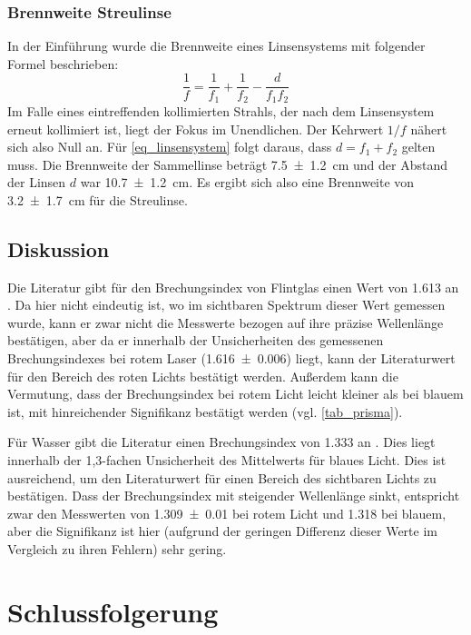 \documentclass[
	a4paper,
	12pt,
	pagesize,
	ngerman
]{scrartcl}
\begin{document}
	\subsubsection{Brennweite Streulinse}
	In der Einführung wurde die Brennweite eines Linsensystems mit folgender Formel beschrieben:
	\begin{equation}
		\frac{1}{f} = \frac{1}{f_1} + \frac{1}{f_2} - \frac{d}{f_1 f_2}
		\label{eq_linsensystem}
	\end{equation}
	Im Falle eines eintreffenden kollimierten Strahls, der nach dem Linsensystem erneut kollimiert ist, liegt der Fokus im Unendlichen.
	Der Kehrwert $1/f$ nähert sich also Null an.
	Für \cref{eq_linsensystem} folgt daraus, dass $d = f_1 + f_2$ gelten muss.
	Die Brennweite der Sammellinse beträgt \SI{7,5+-1,2}{cm} und der Abstand der Linsen $d$ war \SI{10,7 +- 1,2}{cm}.
	Es ergibt sich also eine Brennweite von \SI{3,2+-1,7}{cm} für die Streulinse.
	\subsection{Diskussion}
	Die Literatur gibt für den Brechungsindex von Flintglas einen Wert von \SI{1,613}{} an \cite{flintglasref}.
	Da hier nicht eindeutig ist, wo im sichtbaren Spektrum dieser Wert gemessen wurde, kann er zwar nicht die Messwerte bezogen auf ihre präzise Wellenlänge bestätigen, aber da er innerhalb der Unsicherheiten des gemessenen Brechungsindexes bei rotem Laser (\SI{1,616 \pm 0,006}{}) liegt, kann der Literaturwert für den Bereich des roten Lichts bestätigt werden.
	Außerdem kann die Vermutung, dass der Brechungsindex bei rotem Licht leicht kleiner als bei blauem ist, mit hinreichender Signifikanz bestätigt werden (vgl. \cref{tab_prisma}).
	
	Für Wasser gibt die Literatur einen Brechungsindex von \SI{1,333}{} an \cite{flintglasref}.
	Dies liegt innerhalb der 1,3-fachen Unsicherheit des Mittelwerts für blaues Licht.
	Dies ist ausreichend, um den Literaturwert für einen Bereich des sichtbaren Lichts zu bestätigen.
	Dass der Brechungsindex mit steigender Wellenlänge sinkt, entspricht zwar den Messwerten von \SI{1,309\pm 0,01}{} bei rotem Licht und \SI{1,318}{} bei blauem, aber die Signifikanz ist hier (aufgrund der geringen Differenz dieser Werte im Vergleich zu ihren Fehlern) sehr gering. %
	
	
	\section{Schlussfolgerung}
	
	\printbibliography
\end{document}
